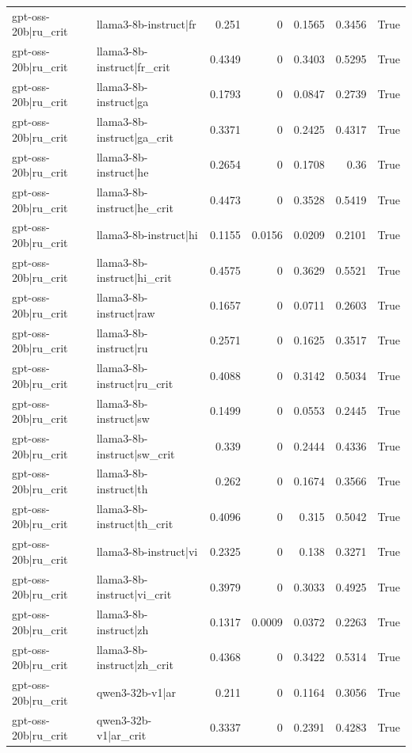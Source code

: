 \begin{table}
\begin{tabular}{l l r r r r l}
gpt-oss-20b|ru_crit & llama3-8b-instruct|fr & 0.251 & 0 & 0.1565 & 0.3456 & True \\
gpt-oss-20b|ru_crit & llama3-8b-instruct|fr_crit & 0.4349 & 0 & 0.3403 & 0.5295 & True \\
gpt-oss-20b|ru_crit & llama3-8b-instruct|ga & 0.1793 & 0 & 0.0847 & 0.2739 & True \\
gpt-oss-20b|ru_crit & llama3-8b-instruct|ga_crit & 0.3371 & 0 & 0.2425 & 0.4317 & True \\
gpt-oss-20b|ru_crit & llama3-8b-instruct|he & 0.2654 & 0 & 0.1708 & 0.36 & True \\
gpt-oss-20b|ru_crit & llama3-8b-instruct|he_crit & 0.4473 & 0 & 0.3528 & 0.5419 & True \\
gpt-oss-20b|ru_crit & llama3-8b-instruct|hi & 0.1155 & 0.0156 & 0.0209 & 0.2101 & True \\
gpt-oss-20b|ru_crit & llama3-8b-instruct|hi_crit & 0.4575 & 0 & 0.3629 & 0.5521 & True \\
gpt-oss-20b|ru_crit & llama3-8b-instruct|raw & 0.1657 & 0 & 0.0711 & 0.2603 & True \\
gpt-oss-20b|ru_crit & llama3-8b-instruct|ru & 0.2571 & 0 & 0.1625 & 0.3517 & True \\
gpt-oss-20b|ru_crit & llama3-8b-instruct|ru_crit & 0.4088 & 0 & 0.3142 & 0.5034 & True \\
gpt-oss-20b|ru_crit & llama3-8b-instruct|sw & 0.1499 & 0 & 0.0553 & 0.2445 & True \\
gpt-oss-20b|ru_crit & llama3-8b-instruct|sw_crit & 0.339 & 0 & 0.2444 & 0.4336 & True \\
gpt-oss-20b|ru_crit & llama3-8b-instruct|th & 0.262 & 0 & 0.1674 & 0.3566 & True \\
gpt-oss-20b|ru_crit & llama3-8b-instruct|th_crit & 0.4096 & 0 & 0.315 & 0.5042 & True \\
gpt-oss-20b|ru_crit & llama3-8b-instruct|vi & 0.2325 & 0 & 0.138 & 0.3271 & True \\
gpt-oss-20b|ru_crit & llama3-8b-instruct|vi_crit & 0.3979 & 0 & 0.3033 & 0.4925 & True \\
gpt-oss-20b|ru_crit & llama3-8b-instruct|zh & 0.1317 & 0.0009 & 0.0372 & 0.2263 & True \\
gpt-oss-20b|ru_crit & llama3-8b-instruct|zh_crit & 0.4368 & 0 & 0.3422 & 0.5314 & True \\
gpt-oss-20b|ru_crit & qwen3-32b-v1|ar & 0.211 & 0 & 0.1164 & 0.3056 & True \\
gpt-oss-20b|ru_crit & qwen3-32b-v1|ar_crit & 0.3337 & 0 & 0.2391 & 0.4283 & True \\

\end{tabular}
\end{table}
